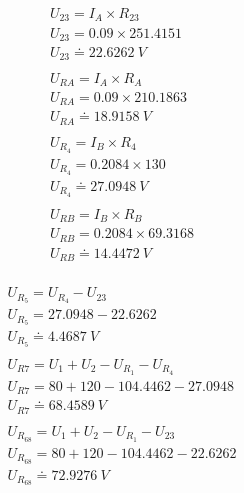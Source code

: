 \begin{figure}
    \begin{gather*}
        U_{23} = I_A \times R_{23} \\
        U_{23} = 0.09 \times 251.4151 \\
        U_{23} \doteq 22.6262 \: V \\
        \\
        U_{RA} = I_A \times R_A \\
        U_{RA} = 0.09 \times 210.1863 \\
        U_{RA} \doteq 18.9158 \: V \\
        \\
        U_{R_4} = I_B \times R_4 \\
        U_{R_4} = 0.2084 \times 130 \\
        U_{R_4} \doteq 27.0948 \: V \\
        \\
        U_{RB} = I_B \times R_B \\
        U_{RB} = 0.2084 \times 69.3168 \\
        U_{RB} \doteq 14.4472 \: V \\
    \end{gather*}
\end{figure}

\begin{figure}
    \begin{gather*}
        U_{R_5} = U_{R_4} - U_{23} \\
        U_{R_5} = 27.0948 - 22.6262 \\
        U_{R_5} \doteq 4.4687 \: V \\
        \\
        U_{R7} = U_1 + U_2 - U_{R_1} - U_{R_4} \\
        U_{R7} = 80 + 120 - 104.4462 - 27.0948 \\
        U_{R7} \doteq  68.4589 \: V \\
        \\
        U_{R_{68}} = U_1 + U_2 - U_{R_1} - U_{23} \\
        U_{R_{68}} = 80 + 120 - 104.4462  - 22.6262 \\
        U_{R_{68}} \doteq 72.9276 \: V \\
    \end{gather*}
\end{figure}

